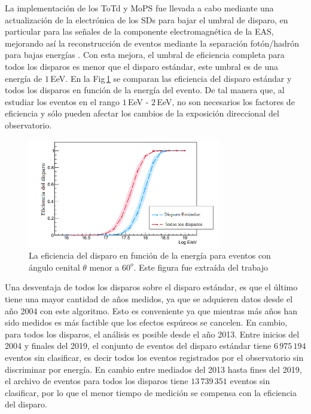 La implementación de los ToTd y MoPS fue llevada a cabo mediante una actualización de la electrónica de los SDs para bajar el umbral de disparo, en particular para las señales de la componente electromagnética de la EAS, mejorando así la reconstrucción de eventos mediante la separación fotón/hadrón para bajas energías  \cite{pierre2013plans}. Con esta mejora, el umbral de eficiencia completa para todos los disparos es menor que el disparo estándar, este umbral es de una energía de $1\,$EeV. En la Fig\,\ref{fig:triggers} se comparan las eficiencia del disparo estándar y todos los disparos en función de la energía del evento. De tal manera que, al estudiar los eventos en el rango $1\,$EeV - $2\,$EeV,  no son necesarios los factores de eficiencia y sólo pueden afectar los cambios de la exposición direccional del observatorio.


\begin{figure}[H]
  \centering
  \includegraphics[width=0.75\textwidth]{comparacion_triggers.png}
  \caption{La eficiencia del disparo en función de la energía para eventos con ángulo cenital $\theta$ menor a $60^o$. Este figura fue extraída del trabajo \cite{triggers_ref}}
  \label{fig:triggers}
\end{figure}


Una desventaja de todos los disparos sobre el disparo estándar, es que el último tiene una mayor cantidad de años medidos, ya que se adquieren datos  desde el año 2004 con este algoritmo. Esto es conveniente ya que mientras más años han sido medidos es más factible que los efectos espúreos se cancelen. En cambio, para todos los disparos, el análisis  es posible desde el año 2013. Entre inicios del 2004 y finales del 2019, el conjunto de eventos del disparo estándar tiene $6\,975\,194$ eventos sin clasificar, es decir todos los eventos registrados por el observatorio sin discriminar por energía. En cambio entre mediados del 2013 hasta fines del 2019, el archivo de eventos para todos los disparos tiene $13\,739\,351$ eventos sin clasificar, por lo que el menor tiempo de medición se compensa con la eficiencia del disparo.


